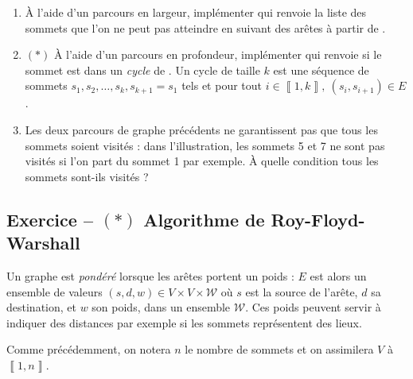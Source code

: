\documentclass{article}
\newcounter{loop}
\newcounter{numEx}
\newcommand{\exo}[1]{
	\stepcounter{numEx}
	\setcounter{loop}{0}
	\subsection*{Exercice \arabic{numEx} -- #1}
}
\newcommand{\llbra}{\left\llbracket}
\newcommand{\rrbra}{\right\rrbracket}
\renewcommand{\brack}[1]{\ensuremath{\llbra#1\rrbra}}
\newcommand{\paren}[1]{\ensuremath{\left(#1\right)}}
\newcommand{\matr}[2]{\mathcal{M}_{#1}\paren{#2}}
\begin{document}
\begin{enumerate}[resume]
	\item À l'aide d'un parcours en largeur, implémenter  qui renvoie la liste des sommets que l'on ne peut pas atteindre en suivant des arêtes à partir de .
	
	\item $(*)$ À l'aide d'un parcours en profondeur, implémenter  qui renvoie  si le sommet  est dans un \emph{cycle} de . Un cycle de taille $k$ est une séquence de sommets $s_1, s_2, \ldots, s_k, s_{k+1} = s_1$ tels et pour tout $i\in\brack{1,k},\ (s_i,s_{i+1})\in E$.

	\item Les deux parcours de graphe précédents ne garantissent pas que tous les sommets soient visités : dans l'illustration, les sommets 5 et 7 ne sont pas visités si l'on part du sommet 1 par exemple. À quelle condition tous les sommets sont-ils visités ?

\end{enumerate}

%

\exo{$(*)$ Algorithme de Roy-Floyd-Warshall}

Un graphe est \emph{pondéré} lorsque les arêtes portent un poids : $E$ est alors un ensemble de valeurs $(s, d, w)\in V\times V\times\mathcal W$ où $s$ est la source de l'arête, $d$ sa destination, et $w$ son poids, dans un ensemble $\mathcal W$. Ces poids peuvent servir à indiquer des distances par exemple si les sommets représentent des lieux.

Comme précédemment, on notera $n$ le nombre de sommets et on assimilera $V$ à $\brack{1,n}$.
\end{document}
